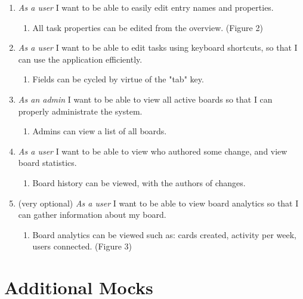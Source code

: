 \documentclass{article}
\begin{document}
	\begin{enumerate}
		\item \emph{As a user} I want to be able to easily edit entry names and properties.
			\begin{enumerate}
				\item All task properties can be edited from the overview. (Figure 2)
			\end{enumerate}
		\item \emph{As a user} I want to be able to edit tasks using keyboard shortcuts, so that I can use the application efficiently.
			\begin{enumerate}
				\item Fields can be cycled by virtue of the "tab" key.
			\end{enumerate}
		\item \emph{As an admin} I want to be able to view all active boards so that I can properly administrate the system.
			\begin{enumerate}
				\item Admins can view a list of all boards.
			\end{enumerate}
		\item \emph{As a user} I want to be able to view who authored some change, and view board statistics.
			\begin{enumerate}
				\item Board history can be viewed, with the authors of changes.
			\end{enumerate}
		\item (very optional) \emph{As a user} I want to be able to view board analytics so that I can gather information about my board.
			\begin{enumerate}
				\item Board analytics can be viewed such as: cards created, activity per week, users connected. (Figure 3)
			\end{enumerate}
	\end{enumerate}


	\section{Additional Mocks}

	\vspace{0.5cm}
		
\end{document}
